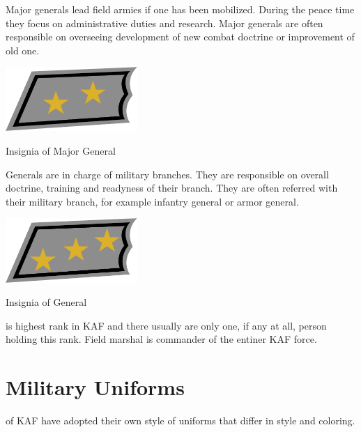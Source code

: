 \documentclass{tufte-book}
\begin{document}
Major generals lead field armies if one has been mobilized. During the peace
time they focus on administrative duties and research. Major generals are
often responsible on overseeing development of new combat doctrine or
improvement of old one.

\begin{marginfigure}[0\baselineskip]
  \includegraphics[width=5.0cm]{rank-major-general}
  \caption{Insignia of Major General}
  \label{fig:insignia_major_general}
\end{marginfigure}


Generals are in charge of military branches. They are responsible on overall
doctrine, training and readyness of their branch. They are often referred with
their military branch, for example infantry general or armor general.

\begin{marginfigure}[0\baselineskip]
  \includegraphics[width=5.0cm]{rank-general}
  \caption{Insignia of General}
  \label{fig:insignia_general}
\end{marginfigure}

  is highest rank in KAF and there
usually are only one, if any at all, person holding this rank. Field marshal
is commander of the entiner KAF force.

\section{Military Uniforms}
\label{sc:military_uniforms}

 of KAF have adopted their own style of
uniforms that differ in style and coloring.
\end{document}
